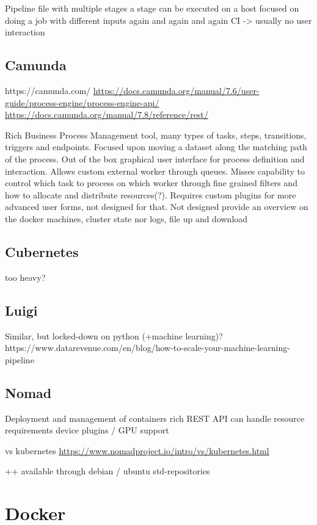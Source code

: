 Pipeline file with multiple stages
a stage can be executed on a host
focused on doing a job with different inputs again and again and again
CI -> usually no user interaction

\subsection{Camunda}

https://camunda.com/
\url{https://docs.camunda.org/manual/7.6/user-guide/process-engine/process-engine-api/}
\url{https://docs.camunda.org/manual/7.8/reference/rest/}

Rich Business Process Management tool, many types of tasks, steps, transitions, triggers and endpoints.
Focused upon moving a dataset along the matching path of the process.
Out of the box graphical user interface for process definition and interaction.
Allows custom external worker through queues.
Misses capability to control which task to process on which worker through fine grained filters and how to allocate and distribute resources(?).
Requires custom plugins for more advanced user forms, not designed for that.
Not designed provide an overview on the docker machines, cluster state nor logs, file up and download

\subsection{Cubernetes}

too heavy?

\subsection{Luigi}

Similar, but locked-down on python  (+machine learning)?
https://www.datarevenue.com/en/blog/how-to-scale-your-machine-learning-pipeline

\subsection{Nomad}

Deployment and management of containers
rich REST API
can handle resource requirements
device plugins / GPU support

vs kubernetes \url{https://www.nomadproject.io/intro/vs/kubernetes.html}

++ available through debian / ubuntu std-repositories

\section{Docker}

